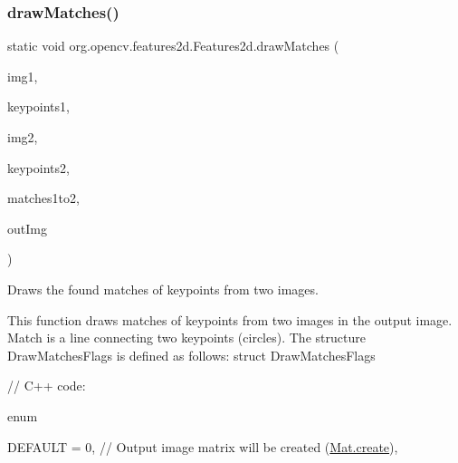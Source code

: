 \subsubsection{\texorpdfstring{draw\+Matches()}{drawMatches()}\hspace{0.1cm}{\footnotesize\ttfamily [2/2]}}
{\footnotesize\ttfamily static void org.\+opencv.\+features2d.\+Features2d.\+draw\+Matches (\begin{DoxyParamCaption}\item[{\mbox{\hyperlink{classorg_1_1opencv_1_1core_1_1_mat}{Mat}}}]{img1,  }\item[{\mbox{\hyperlink{classorg_1_1opencv_1_1core_1_1_mat_of_key_point}{Mat\+Of\+Key\+Point}}}]{keypoints1,  }\item[{\mbox{\hyperlink{classorg_1_1opencv_1_1core_1_1_mat}{Mat}}}]{img2,  }\item[{\mbox{\hyperlink{classorg_1_1opencv_1_1core_1_1_mat_of_key_point}{Mat\+Of\+Key\+Point}}}]{keypoints2,  }\item[{\mbox{\hyperlink{classorg_1_1opencv_1_1core_1_1_mat_of_d_match}{Mat\+Of\+D\+Match}}}]{matches1to2,  }\item[{\mbox{\hyperlink{classorg_1_1opencv_1_1core_1_1_mat}{Mat}}}]{out\+Img }\end{DoxyParamCaption})\hspace{0.3cm}{\ttfamily [static]}}

Draws the found matches of keypoints from two images.

This function draws matches of keypoints from two images in the output image. Match is a line connecting two keypoints (circles). The structure {\ttfamily Draw\+Matches\+Flags} is defined as follows\+: struct Draw\+Matches\+Flags {\ttfamily }

{\ttfamily }

{\ttfamily }

{\ttfamily // C++ code\+:}

{\ttfamily }

{\ttfamily }

{\ttfamily enum}

{\ttfamily }

{\ttfamily }

{\ttfamily D\+E\+F\+A\+U\+LT = 0, // Output image matrix will be created (\mbox{\hyperlink{classorg_1_1opencv_1_1core_1_1_mat_a539b0a3690afb6b43047b50cbb787fee}{Mat.\+create}}),}

{\ttfamily }

{\ttfamily }

